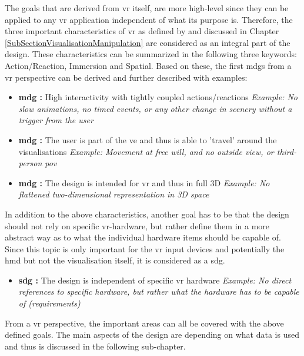 The goals that are derived from \gls{vr} itself, are more high-level since they can be applied to any \gls{vr} application independent of what its purpose is. Therefore, the three important characteristics of \gls{vr} as defined by \cite{Stone1994} and discussed in Chapter \ref{SubSectionVisualisationManipulation} are considered as an integral part of the design. These characteristics can be summarized in the following three keywords: Action/Reaction, Immersion and Spatial. Based on these, the first \glspl{mdg} from a \gls{vr} perspective can be derived and further described with examples:
\begin{itemize}[noitemsep,nolistsep]
	\item \textbf{\gls{mdg} :} High interactivity with tightly coupled actions/reactions \newline
		\textit{Example: No slow animations, no timed events, or any other change in scenery without a trigger from the user}
	\item \textbf{\gls{mdg} :} The user is part of the \gls{ve} and thus is able to 'travel' around the visualisations \newline
		\textit{Example: Movement at free will, and no outside view, or third-person \gls{pov}}
	\item \textbf{\gls{mdg} :} The design is intended for \gls{vr} and thus in full 3D \newline
		\textit{Example: No flattened two-dimensional representation in 3D space}
\end{itemize}
In addition to the above characteristics, another goal has to be that the design should not rely on specific \gls{vr}-hardware, but rather define them in a more abstract way as to what the individual hardware items should be capable of. Since this topic is only important for the \gls{vr} input devices and potentially the \gls{hmd} but not the visualisation itself, it is considered as a \gls{sdg}.
\begin{itemize}[noitemsep,nolistsep]
	\item \textbf{\gls{sdg} :} The design is independent of specific \gls{vr} hardware \newline
		\textit{Example: No direct references to specific hardware, but rather what the hardware has to be capable of (requirements)}
\end{itemize}
From a \gls{vr} perspective, the important areas can all be covered with the above defined goals. The main aspects of the design are depending on what data is used and thus is discussed in the following sub-chapter.


